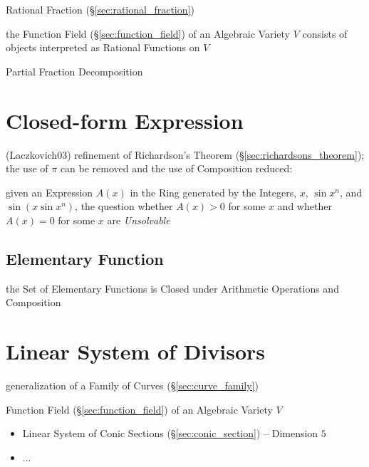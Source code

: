 Rational Fraction (\S\ref{sec:rational_fraction})

the Function Field (\S\ref{sec:function_field}) of an Algebraic Variety $V$
consists of objects interpreted as Rational Functions on $V$

Partial Fraction Decomposition



\section{Closed-form Expression}\label{sec:closed_form_expression}

(Laczkovich03) refinement of Richardson's Theorem
(\S\ref{sec:richardsons_theorem}); the use of $\pi$ can be removed and the use
of Composition reduced:

given an Expression $A(x)$ in the Ring generated by the Integers, $x$, $\sin
x^n$, and $\sin(x \sin x^n)$, the question whether $A(x) > 0$ for some $x$ and
whether $A(x) = 0$ for some $x$ are \emph{Unsolvable}



\subsection{Elementary Function}\label{sec:elementary_function}

the Set of Elementary Functions is Closed under Arithmetic Operations and
Composition



\section{Linear System of Divisors}\label{sec:linear_system_of_divisors}

generalization of a Family of Curves (\S\ref{sec:curve_family})

Function Field (\S\ref{sec:function_field}) of an Algebraic Variety $V$

\begin{itemize}
  \item Linear System of Conic Sections (\S\ref{sec:conic_section}) --
    Dimension $5$
  \item ...
\end{itemize}



